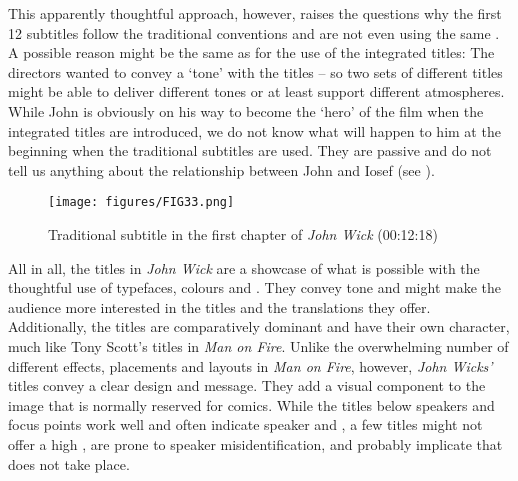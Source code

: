 \largerpage
This apparently thoughtful approach, however, raises the questions why the first 12 subtitles follow the traditional conventions and are not even using the same . A possible reason might be the same as for the use of the integrated titles: The directors wanted to convey a ‘tone’ with the titles – so two sets of different titles might be able to deliver different tones or at least support different atmospheres. While John is obviously on his way to become the ‘hero’ of the film when the integrated titles are introduced, we do not know what will happen to him at the beginning when the traditional subtitles are used. They are passive and do not tell us anything about the relationship between John and Iosef (see ).

\begin{figure}
\texttt{[image: figures/FIG33.png]}
\caption{Traditional subtitle in the first chapter of \textit{John Wick} (00:12:18)}
\label{fig:FIG33}
\end{figure}

All in all, the titles in \textit{John Wick} are a showcase of what is possible with the thoughtful use of typefaces, colours and . They convey tone and might make the audience more interested in the titles and the translations they offer. Additionally, the titles are comparatively dominant and have their own character, much like Tony Scott’s titles in \textit{Man on Fire}. Unlike the overwhelming number of different effects, placements and layouts in \textit{Man on Fire}, however, \textit{John Wicks’} titles convey a clear design and message. They add a visual component to the image that is normally reserved for comics. While the titles below speakers and focus points work well and often indicate speaker and , a few titles might not offer a high , are prone to speaker misidentification, and probably implicate  that does not take place.

